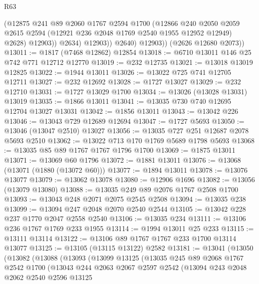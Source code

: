 \begin{lexlean}{R63}
\begin{coremodule}
                    (@12875
                      @241
                      @89
                      @2060
                      @1767
                      @2594
                      @1700
                      (@12866
                        @240
                        @2050
                        @2059
                        @2615
                        @2594
                        (@12921 @236 @2048 @1769 @2540 @1955 @12952 @12949)
                        @2628)
                      @12903))
                  @2634)
                @12903))
            @2640)
          @12903))
      (@2626 @12680 @2073))
@13011 := @1817 (@7468 @12862) @12854
@13018 := @6710 @13011 @146 @25 @742 @771 @12712 @12770
@13019 := @232 @12735
@13021 := @13018 @13019 @12825
@13022 := @1944 @13011
@13026 := @13022 @725 @741 @12705 @12711
@13027 := @232 @12692
@13028 := @1727 @13027
@13029 := @232 @12710
@13031 := @1727 @13029 @1700
@13034 := @13026 (@13028 @13031) @13019
@13035 := @1866 @13011
@13041 := @13035 @730 @740 @12695 @12704 @13027 @13031
@13042 := @1856 @13011
@13043 := @13042 @226
@13046 := @13043 @729 @12689 @12694
@13047 := @1727 @5693
@13050 := @13046 (@13047 @2510) @13027
@13056 := @13035 @727 @251 @12687 @2078 @5693 @2510
@13062 := @13022 @713 @170 @1769 @5689 @1798 @5693
@13068 := @13035 @85 @89 @1767 @1767 @1796 @1700
@13069 := @1875 @13011
@13071 := @13069 @60 @1796
@13072 := @1881 @13011
@13076 := @13068 (@13071 (@1880 (@13072 @60)))
@13077 := @1894 @13011
@13078 := @13076 @13077
@13079 := @13062 @13078
@13080 := @12906 @1696
@13082 := @13056 (@13079 @13080)
@13088 := @13035 @249 @89 @2076 @1767 @2508 @1700
@13093 := @13043 @248 @2071 @2075 @2545 @2508
@13094 := @13035 @238
@13099 := @13094 @247 @2048 @2070 @2540 @2544
@13105 := @13042 @228 @237 @1770 @2047 @2558 @2540
@13106 := @13035 @234
@13111 := @13106 @236 @1767 @1769 @233 @1955
@13114 := @1994 @13011 @25 @233
@13115 := @13111 @13114
@13122 := @13106 @89 @1767 @1767 @233 @1700 @13114 @13077
@13125 := @13105 (@13115 @13122) @2582
@13181 := @13041
    (@13050
      (@13082
        (@13088
          (@13093
            (@13099
              @13125
              (@13035
                @245
                @89
                @2068
                @1767
                @2542
                @1700
                (@13043
                  @244
                  @2063
                  @2067
                  @2597
                  @2542
                  (@13094
                    @243
                    @2048
                    @2062
                    @2540
                    @2596
                    @13125

\end{coremodule}
\end{lexlean}
